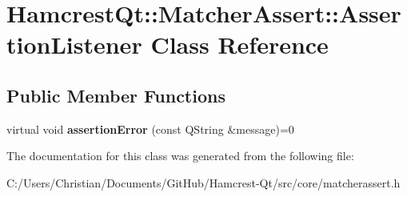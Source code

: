 \hypertarget{class_hamcrest_qt_1_1_matcher_assert_1_1_assertion_listener}{\section{Hamcrest\-Qt\-:\-:Matcher\-Assert\-:\-:Assertion\-Listener Class Reference}
\label{class_hamcrest_qt_1_1_matcher_assert_1_1_assertion_listener}
}
\subsection*{Public Member Functions}
\begin{DoxyCompactItemize}
\item 
\hypertarget{class_hamcrest_qt_1_1_matcher_assert_1_1_assertion_listener_a3b4340dac131adf094dc786d11d3554e}{virtual void {\bfseries assertion\-Error} (const Q\-String \&message)=0}\label{class_hamcrest_qt_1_1_matcher_assert_1_1_assertion_listener_a3b4340dac131adf094dc786d11d3554e}

\end{DoxyCompactItemize}


The documentation for this class was generated from the following file\-:\begin{DoxyCompactItemize}
\item 
C\-:/\-Users/\-Christian/\-Documents/\-Git\-Hub/\-Hamcrest-\/\-Qt/src/core/matcherassert.\-h\end{DoxyCompactItemize}
